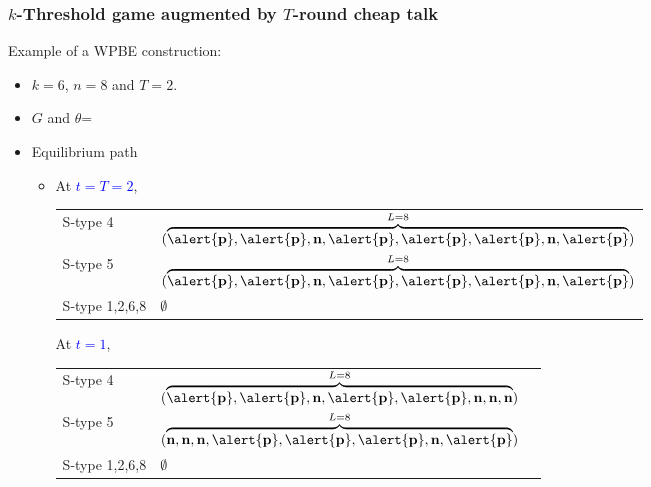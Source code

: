 \documentclass[9pt]{beamer}
\begin{document}
\begin{frame}
  \frametitle{$k$-Threshold game augmented by $T$-round cheap talk}
Example of a WPBE construction:
\begin{itemize}
\item $k=6$, $n=8$ and $T=2$.
\item $G$ and $\theta$=
\begin{center}
\end{center}
\end{itemize}

\begin{itemize}
\item Equilibrium path
\begin{itemize}
\item 
{}
{
At \textcolor{blue}{$t=T=2$}, 
\begin{table}[h]
\begin{tabular}{ll }
S-type 4 & $(\overbrace{\alert{\textbf{p}},\alert{\textbf{p}},\textbf{n},\alert{\textbf{p}},\alert{\textbf{p}},\alert{\textbf{p}},\textbf{n},\alert{\textbf{p}}}^{L=8})$\\
S-type 5 & $(\overbrace{\alert{\textbf{p}},\alert{\textbf{p}},\textbf{n},\alert{\textbf{p}},\alert{\textbf{p}},\alert{\textbf{p}},\textbf{n},\alert{\textbf{p}}}^{L=8})$\\
S-type 1,2,6,8 & $\emptyset$
\end{tabular}
\end{table}
}
{
At \textcolor{blue}{$t=1$}, 
\begin{table}[h]
\begin{tabular}{ll l}
S-type 4 & $(\overbrace{\alert{\textbf{p}},\alert{\textbf{p}},\textbf{n},\alert{\textbf{p}},\alert{\textbf{p}},\textbf{n},\textbf{n},\textbf{n}}^{L=8})$\\
S-type 5 & $(\overbrace{\textbf{n},\textbf{n},\textbf{n},\alert{\textbf{p}},\alert{\textbf{p}},\alert{\textbf{p}},\textbf{n},\alert{\textbf{p}}}^{L=8})$ \\
S-type 1,2,6,8 & $\emptyset$
\end{tabular}
\end{table}
}


\end{itemize}
\end{itemize}
\end{frame}
\end{document}
